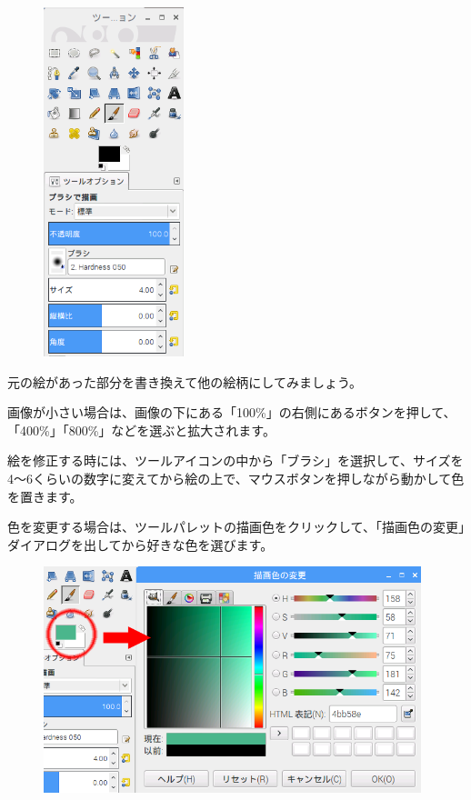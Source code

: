 \begin{figure}[H]
    \begin{center}
      \includegraphics[keepaspectratio,width=4.075cm,height=10.16cm]{text04-img/text04-img030.png}
    \end{center}
    \label{fig:prog_menu}
\end{figure}


元の絵があった部分を書き換えて他の絵柄にしてみましょう。

画像が小さい場合は、画像の下にある「100\%」の右側にあるボタンを押して、「400\%」「800\%」などを選ぶと拡大されます。

絵を修正する時には、ツールアイコンの中から「ブラシ」を選択して、サイズを4〜6くらいの数字に変えてから絵の上で、マウスボタンを押しながら動かして色を置きます。


色を変更する場合は、ツールパレットの描画色をクリックして、「描画色の変更」ダイアログを出してから好きな色を選びます。

\begin{figure}[H]
    \begin{center}
      \includegraphics[keepaspectratio,width=10.993cm,height=6.588cm]{text04-img/text04-img031.png}
    \end{center}
    \label{fig:prog_menu}
\end{figure}

